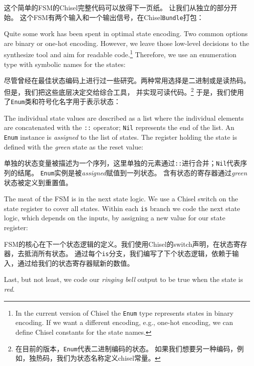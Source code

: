 \documentclass[%
    10pt,
    headinclude, footexclude,
    openright, %
    notitlepage,
    cleardoubleempty,
    headsepline,
    pointlessnumbers,
    bibtotoc, idxtotoc,
    ]{scrbook}
\newcommand{\code}[1]{{\small{\texttt{#1}}}}
\begin{document}
这个简单的FSM的Chisel完整代码可以放得下一页纸。
让我们从独立的部分开始。
这个FSM有两个输入和一个输出信号，在Chisel\code{Bundle}打包：


\noindent Quite some work has been spent in optimal state encoding. Two common options
are binary or one-hot encoding. However, we leave those low-level decisions to
the synthesize tool and aim for readable code.\footnote{In the current version
of Chisel the \code{Enum} type represents states in binary encoding.
If we want a different encoding, e.g., one-hot encoding, we can define Chisel
constants for the state names.}
Therefore, we use an enumeration type with symbolic names for the states:

\noindent 尽管曾经在最佳状态编码上进行过一些研究。两种常用选择是二进制或是读热码。但是，我们把这些底层决定交给综合工具，
并实现可读代码。\footnote{在目前的版本，\code{Enum}代表二进制编码的状态。
如果我们想要另一种编码，例如，独热码，我们为状态名称定义chisel常量。}
于是，我们使用了\code{Enum}类和符号化名字用于表示状态：


\noindent The individual state values are described as a list where the individual
elements are concatenated with the \code{::} operator; \code{Nil} represents
the end of the list. An \code{Enum} instance is \emph{assigned} to the list of states.
The register holding the state is defined with the \emph{green} state as the reset value:

\noindent 单独的状态变量被描述为一个序列，这里单独的元素通过\code{::}进行合并；\code{Nil}代表序列的结尾。
\code{Enum}实例是被\emph{assigned}赋值到一列状态。
含有状态的寄存器通过\emph{green}状态被定义到重置值。



\noindent The meat of the FSM is in the next state logic. We use a Chisel switch on the
state register to cover all states. Within each \code{is} branch we code the next state
logic, which depends on the inputs, by assigning a new value for our state register:

\noindent FSM的核心在下一个状态逻辑的定义。我们使用Chisel的switch声明，在状态寄存器，去抵消所有状态。
通过每个\code{is}分支，我们编写了下个状态逻辑，依赖于输入，通过给我们的状态寄存器赋新的数值。


\noindent Last, but not least, we code our \emph{ringing bell} output to be true when
the state is \emph{red}.
\end{document}

